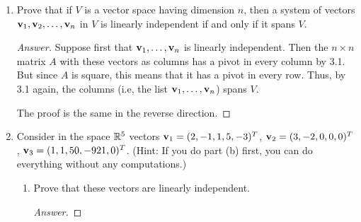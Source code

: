 \documentclass[../psets.tex]{subfiles}
\begin{document}
\begin{enumerate}[label={\textbf{5.\arabic*.}}]
\begin{enumerate}
        \begin{proof}[Answer]
            False.\par
            The vectors $1,2\in\R^1$ span $\R^1$, but $3=1+2$ and $3=-1(1)+2(2)$.
        \end{proof}
        \item Every subspace of a finite-dimensional space is finite-dimensional.
        \begin{proof}[Answer]
            True.\par
            See Theorem 5.5.
        \end{proof}
        \item If $V$ is a vector space having dimension $n$, then $V$ has exactly one subspace of dimension 0 and exactly one subspace of dimension $n$.
        \begin{proof}[Answer]
            True.\par
            $\{0\}$ is THE unique VS of dimension 0 and a subspace of every vector space, so that part is true. On the other hand, any subspace of $\dim n$ has a basis consisting of $n$ linearly independent, spanning elements of $V$. But any such list is also a basis of $V$, so the subspace is $V$.
        \end{proof}
    \end{enumerate}
    \item Prove that if $V$ is a vector space having dimension $n$, then a system of vectors $\mathbf{v}_1,\mathbf{v}_2,\dots,\mathbf{v}_n$ in $V$ is linearly independent if and only if it spans $V$.
    \begin{proof}[Answer]
        Suppose first that $\mathbf{v}_1,\dots,\mathbf{v}_n$ is linearly independent. Then the $n\times n$ matrix $A$ with these vectors as columns has a pivot in every column by 3.1. But since $A$ is square, this means that it has a pivot in every row. Thus, by 3.1 again, the columns (i.e, the list $\mathbf{v}_1,\dots,\mathbf{v}_n$) spans $V$.\par
        The proof is the same in the reverse direction.
    \end{proof}
    \setcounter{enumi}{5}
    \item Consider in the space $\mathbb{R}^5$ vectors $\mathbf{v}_1=(2,-1,1,5,-3)^T$, $\mathbf{v}_2=(3,-2,0,0,0)^T$, $\mathbf{v}_3=(1,1,50,-921,0)^T$. (Hint: If you do part (b) first, you can do everything without any computations.)
    \begin{enumerate}
        \item Prove that these vectors are linearly independent.
        \begin{proof}[Answer]

\end{proof}
\end{enumerate}
\end{enumerate}
\end{document}
